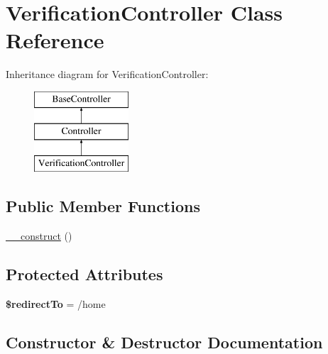 \hypertarget{class_app_1_1_http_1_1_controllers_1_1_auth_1_1_verification_controller}{}\section{Verification\+Controller Class Reference}
\label{class_app_1_1_http_1_1_controllers_1_1_auth_1_1_verification_controller}
Inheritance diagram for Verification\+Controller\+:\begin{figure}[H]
\begin{center}
\leavevmode
\includegraphics[height=3.000000cm]{class_app_1_1_http_1_1_controllers_1_1_auth_1_1_verification_controller}
\end{center}
\end{figure}
\subsection*{Public Member Functions}
\begin{DoxyCompactItemize}
\item 
\mbox{\hyperlink{class_app_1_1_http_1_1_controllers_1_1_auth_1_1_verification_controller_a095c5d389db211932136b53f25f39685}{\+\_\+\+\_\+construct}} ()
\end{DoxyCompactItemize}
\subsection*{Protected Attributes}
\begin{DoxyCompactItemize}
\item 
\mbox{\label{class_app_1_1_http_1_1_controllers_1_1_auth_1_1_verification_controller_a1d19101ee5de7186666ce86a530cd501}} 
{\bfseries \$redirect\+To} = \textquotesingle{}/home\textquotesingle{}
\end{DoxyCompactItemize}


\subsection{Constructor \& Destructor Documentation}
\mbox{\label{class_app_1_1_http_1_1_controllers_1_1_auth_1_1_verification_controller_a095c5d389db211932136b53f25f39685}} 
